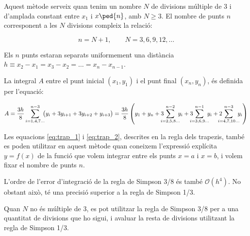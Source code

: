 Aquest mètode serveix quan tenim un nombre  $N$ de divisions múltiple de 3 i d'amplada constant entre $x_1$ i $x\ped{n}$, amb $N \geq 3$.  El nombre de punts $n$ corresponent a les $N$ divisions  compleix la relació:

\begin{equation}
	n = N+1,\qquad N = 3, 6, 9, 12, \dots
\end{equation}
 
Els $n$ punts estaran separats uniformement una distància $h \equiv x_2-x_1 = x_3-x_2 = \dots = x_n-x_{n-1}$.

La integral $A$ entre el punt inicial $(x_1, y_1)$ i el punt final $(x_n, y_n)$, és definida per l'equació:

 \begin{equation}\label{eq:simp_3_8}
   A =  \frac{3h}{8} \sum_{i=1,4,7\dots}^{n-3} \hspace{-0.5em} \big( y_i + 3 y_{i+1} + 3 y_{i+2} + y_{i+3}\big) =
   \frac{3h}{8} \left( y_1 + y_n + 3 \hspace{-0.7em} \sum_{i=2,5,8\dots}^{n-2} \hspace{-0.5em} y_i +
   3 \hspace{-0.7em} \sum_{i=3,6,9\dots}^{n-1} \hspace{-0.5em} y_i
   + 2 \hspace{-0.9em} \sum_{i=4,7,10\dots}^{n-3} \hspace{-0.5em} y_i \right)
 \end{equation}

 Les equacions \eqref{eq:trap_1} i \eqref{eq:trap_2}, descrites en la regla dels trapezis, també es poden utilitzar en aquest mètode quan  coneixem l'expressió explícita $y=f(x)$ de la funció que volem integrar entre els punts $x=a$ i $x=b$, i volem fixar el nombre de punts $n$.

 L'ordre de l'error d'integració de la regla de Simpson 3/8 és també $\mathscr{O}(h^4)$. No obstant això, té una precisió superior a la regla de Simpson 1/3.
 
 Quan  $N$ no és múltiple de 3, es pot utilitzar la regla de Simpson 3/8 per a una quantitat de divisions que ho sigui, i avaluar la resta de divisions utilitzant la  regla de Simpson 1/3.


